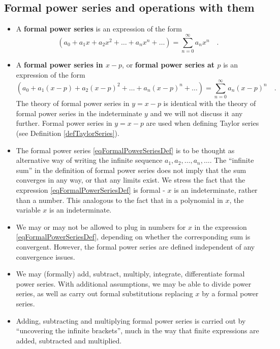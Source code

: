 \documentclass[12pt]{book}
\renewcommand{\emph}{\textbf}
\begin{document}
\subsection{Formal power series and operations with them}\label{secFormalPowerSeries}
\begin{itemize}
\item {} A \emph{formal power series} is an expression of the form 
\begin{equation}\label{eqFormalPowerSeriesDef}
(a_0 + a_1x+a_2x^2+\dots +a_nx^n+\dots)= \sum_{n=0}^{\infty} a_n x^n \quad .
\end{equation}
\item {} A \emph{formal power series in $x-p$}, or \emph{formal power series at $p$} is an expression of the form 
\begin{equation}\label{eqFormalPowerAtPSeriesDef}
(a_0 + a_1(x-p)+a_2(x-p)^2+\dots +a_n(x-p)^n+\dots)= \sum_{n=0}^{\infty} a_n (x-p)^n \quad .
\end{equation}
The theory of formal power series in $y=x-p$ is identical with the theory of formal power series in the indeterminate $y$ and we will not discuss it any further. Formal power series in $y=x-p$ are used when defining Taylor series (see Definition \ref{defTaylorSeries}).
\item The formal power series \eqref{eqFormalPowerSeriesDef} is to be thought as alternative way of writing the infinite sequence $a_1, a_2, \dots, a_n,\dots $. The ``infinite sum'' in the definition of formal power series does not imply that the sum converges in any way, or that any limits exist. We stress the fact that the expression  \eqref{eqFormalPowerSeriesDef} is  formal - $x$  is an indeterminate, rather than a number. This analogous to the fact that in a polynomial in $x$, the variable $x$ is an indeterminate.
\item We may or may not be allowed to plug in numbers for $x$ in the expression \eqref{eqFormalPowerSeriesDef}, depending on whether the corresponding sum is convergent. However, the formal power series are defined independent of any convergence issues.
\item We may (formally) add, subtract, multiply, integrate, differentiate formal power series. With additional assumptions, we may be able to divide power series, as well as carry out formal substitutions replacing $x$ by a formal power series. 
\item Adding, subtracting and multiplying formal power series is carried out by ``uncovering the infinite brackets'', much in the way that finite expressions are added, subtracted and multiplied.

\end{itemize}
\end{document}
